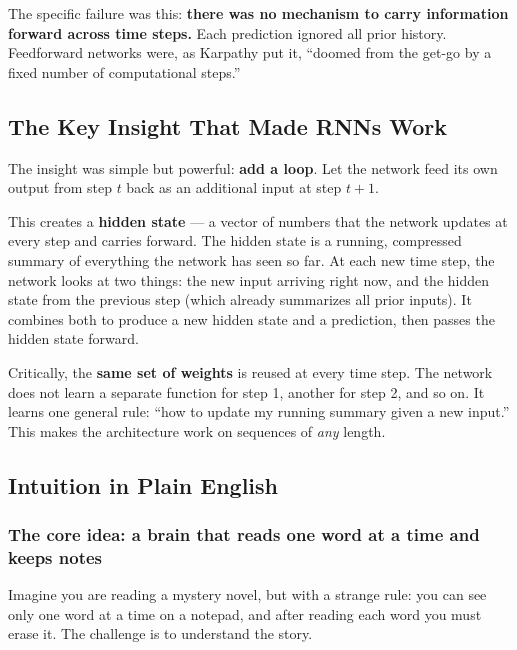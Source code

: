 \documentclass[12pt,a4paper]{article}
\begin{document}
The specific failure was this: \textbf{there was no mechanism to carry information
forward across time steps.} Each prediction ignored all prior history.
Feedforward networks were, as Karpathy put it, ``doomed from the get-go by a fixed
number of computational steps.''

\subsection{The Key Insight That Made RNNs Work}

The insight was simple but powerful: \textbf{add a loop}. Let the network feed its own
output from step $t$ back as an additional input at step $t{+}1$.

This creates a \textbf{hidden state} --- a vector of numbers that the network updates at
every step and carries forward. The hidden state is a running, compressed summary of
everything the network has seen so far. At each new time step, the network looks at two
things: the new input arriving right now, and the hidden state from the previous step
(which already summarizes all prior inputs). It combines both to produce a new hidden
state and a prediction, then passes the hidden state forward.

Critically, the \textbf{same set of weights} is reused at every time step. The network
does not learn a separate function for step 1, another for step 2, and so on. It learns
one general rule: ``how to update my running summary given a new input.'' This makes the
architecture work on sequences of \textit{any} length.

\subsection{Intuition in Plain English}

\subsubsection{The core idea: a brain that reads one word at a time and keeps notes}

Imagine you are reading a mystery novel, but with a strange rule: you can see only
one word at a time on a notepad, and after reading each word you must erase it. The
challenge is to understand the story.
\end{document}
